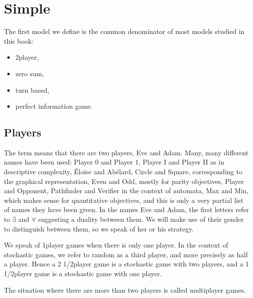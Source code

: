 \documentclass[letterpaper,10pt,english]{sphinxmanual}
\begin{document}
\section{Simple}
\label{\detokenize{1_Introduction/simple:simple}}\label{\detokenize{1_Introduction/simple:sec-simple}}\label{\detokenize{1_Introduction/simple::doc}}
The first model we define is the common denominator of most models studied in this book:
\begin{itemize}
\item {} 
\(2\)\sphinxhyphen{}player,

\item {} 
zero sum,

\item {} 
turn based,

\item {} 
perfect information
game.

\end{itemize}


\subsection{Players}
\label{\detokenize{1_Introduction/simple:players}}\label{\detokenize{1_Introduction/simple:subsec-players}}
The term  means that there are two players, Eve and Adam. Many, many different names
have been used: Player \(0\) and Player \(1\), Player I and Player II as in
descriptive complexity, Éloïse and Abélard, Circle and Square,
corresponding to the graphical representation, Even and Odd, mostly for
parity objectives, Player and Opponent, Pathfinder and Verifier in the
context of automata, Max and Min, which makes sense for quantitative
objectives, and this is only a very partial list of names they have been
given. In the names Eve and Adam, the first letters refer to \(\exists\)
and \(\forall\) suggesting a duality between them. We will make use of
their gender to distinguish between them, so we speak of her or his
strategy.

We speak of 1\sphinxhyphen{}player games when there is only one player. In the
context of stochastic games, we refer to random as a third player, and
more precisely as half a player. Hence a 2 1/2\sphinxhyphen{}player game is a
stochastic game with two players, and a 1 1/2\sphinxhyphen{}player game is a
stochastic game with one player.

The situation where there are more than two players is called
multiplayer games.
\end{document}
